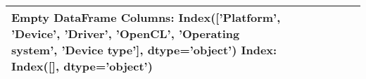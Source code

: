 \begin{tabular}{lllllll}
\toprule
Empty DataFrame
Columns: Index(['Platform', 'Device', 'Driver', 'OpenCL', 'Operating system',
       'Device type'],
      dtype='object')
Index: Index([], dtype='object') \\
\bottomrule
\end{tabular}
